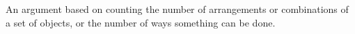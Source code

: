 An argument based on counting the number of arrangements or combinations of
a set of objects, or the number of ways something can be done.